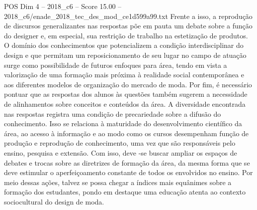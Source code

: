 \begin{textsample}{POS Dim 4 – 2018\_c6 – Score 15.00 – 2018\_c6/enade\_2018\_tec\_des\_mod\_ce1d599a99.txt}
Frente a isso, a reprodução de discursos generalizantes nas respostas põe em pauta um debate sobre a função do designer e, em especial, sua restrição de trabalho na estetização de produtos.
O domínio dos conhecimentos que potencializem a condição interdisciplinar do design e que permitam um reposicionamento de seu lugar no campo de atuação surge como possibilidade de futuros enfoques para área, tendo em vista a valorização de uma formação mais próxima à realidade social contemporânea e aos diferentes modelos de organização do mercado de moda.
Por fim, é necessário pontuar que as respostas dos alunos às questões também sugerem a necessidade de alinhamentos sobre conceitos e conteúdos da área.
A diversidade encontrada nas respostas registra uma condição de precariedade sobre a difusão do conhecimento.
Isso se relaciona à maturidade do desenvolvimento científico da área, ao acesso à informação e ao modo como os cursos desempenham função de produção e reprodução de conhecimento, uma vez que são responsáveis pelo ensino, pesquisa e extensão.
Com isso, deve -se buscar ampliar os espaços de debates e trocas sobre as diretrizes de formação da área, da mesma forma que se deve estimular o aperfeiçoamento constante de todos os envolvidos no ensino.
Por meio dessas ações, talvez se possa chegar a índices mais equânimes sobre a formação dos estudantes, pondo em destaque uma educação atenta ao contexto sociocultural do design de moda.

\end{textsample}
